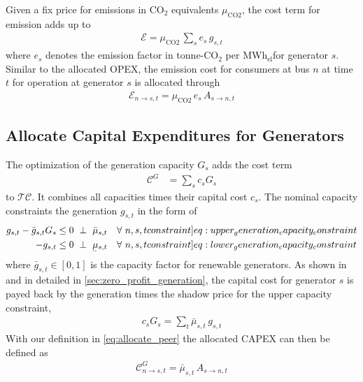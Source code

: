 \documentclass[11pt,twocolumn]{article}
\newcommand{\ubar}[1]{\underaccent{\bar}{#1}}
\newcommand{\resultsin}[1]{\hspace{6pt} \bot  \hspace{6pt} #1}
\newcommand{\Forall}[1]{\hspace{10pt} \forall \,\, #1 }
\newcommand{\generation}{g_{s,t}}
\newcommand{\generationpotential}{\bar{g}_{s,t}}
\newcommand{\capacitygeneration}{G_{s}}
\newcommand{\capitalpricegeneration}{c_{s}}
\newcommand{\mulowergeneration}{\ubar{\mu}_{s,t}}
\newcommand{\muuppergeneration}{\bar{\mu}_{s,t}}
\newcommand{\allocatepeer}[1][s \rightarrow n]{A_{#1,t}}
\newcommand{\allocatecapexgeneration}[1][n]{\mathcal{C}^{G}_{#1,t}}
\newcommand{\allocateemissioncost}[1][n]{\mathcal{E}_{#1,t}}
\newcommand{\emission}{e_{s}}
\newcommand{\emissionprice}{\mu_{\text{CO2}}}
\newcommand{\megawatthour}{MWh$_\text{el}$}
\newcommand{\totalcost}{\mathcal{TC}}
\newcommand{\capexgeneration}{\mathcal{C}^G}
\newcommand{\emissioncost}{\mathcal{E}}
\begin{document}
Given a fix price for emissions in CO$_2$ equivalents $\emissionprice$, the cost term for emission adds up to 
\begin{align}
 \emissioncost = \emissionprice \, \sum_s  \emission \, \generation
\end{align}
where $\emission$ denotes the emission factor in tonne-CO$_2$ per \megawatthour for generator $s$.
Similar to the allocated OPEX, the emission cost for consumers at bus $n$ at time $t$ for operation at generator $s$ is allocated through
\begin{align}
 \allocateemissioncost[n \rightarrow s] = \emissionprice \, \emission \, \allocatepeer
\end{align}


\subsection{Allocate Capital Expenditures for Generators}

The optimization of the generation capacity $\capacitygeneration$ adds the cost term 
\begin{align}
 \capexgeneration& = \sum_{s} \capitalpricegeneration \capacitygeneration 
\end{align}
to $\totalcost$. It combines all capacities times their capital cost $\capitalpricegeneration$. The nominal capacity constraints the generation $\generation$ in the form of 
\begin{align}
\generation - \generationpotential \capacitygeneration  &\le 0 \resultsin{\muuppergeneration} \Forall{n,s,t} 
\label[constraint]{eq:upper_generation_capacity_constraint}\\ 
- \generation &\le 0 \resultsin{\mulowergeneration} \Forall{n,s,t} 
\label[constraint]{eq:lower_generation_capacity_constraint}
\end{align}
where $\generationpotential \in \left[ 0,1\right]$ is the capacity factor for renewable generators. As shown in \cite{brown_decreasing_2020} and in detailed in \cref{sec:zero_profit_generation},  the capital cost  for generator $s$ is payed back by the generation times the shadow price for the upper capacity constraint, 
\begin{align}
 \capitalpricegeneration \capacitygeneration = \sum_t \muuppergeneration \,  \generation 
 \label{eq:no_profit_capex_generation}
\end{align}
With our definition in \cref{eq:allocate_peer} the allocated CAPEX can then be defined as 
\begin{align}
 \allocatecapexgeneration[n \rightarrow s] = \muuppergeneration \, \allocatepeer
 \label{eq:allocate_capexGeneration_detailed}
\end{align}
\end{document}

